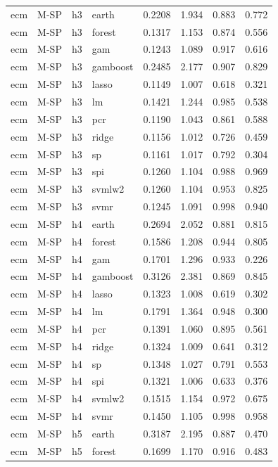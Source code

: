 \begin{ThreePartTable}
\begin{longtable}[t]{llclcccc}
\addlinespace
ecm & M-SP & h3 & earth & 0.2208 & 1.934 & 0.883 & 0.772\\
ecm & M-SP & h3 & forest & 0.1317 & 1.153 & 0.874 & 0.556\\
ecm & M-SP & h3 & gam & 0.1243 & 1.089 & 0.917 & 0.616\\
ecm & M-SP & h3 & gamboost & 0.2485 & 2.177 & 0.907 & 0.829\\
ecm & M-SP & h3 & lasso & 0.1149 & 1.007 & 0.618 & 0.321\\
ecm & M-SP & h3 & lm & 0.1421 & 1.244 & 0.985 & 0.538\\
ecm & M-SP & h3 & pcr & 0.1190 & 1.043 & 0.861 & 0.588\\
ecm & M-SP & h3 & ridge & 0.1156 & 1.012 & 0.726 & 0.459\\
ecm & M-SP & h3 & sp & 0.1161 & 1.017 & 0.792 & 0.304\\
ecm & M-SP & h3 & spi & 0.1260 & 1.104 & 0.988 & 0.969\\
ecm & M-SP & h3 & svmlw2 & 0.1260 & 1.104 & 0.953 & 0.825\\
ecm & M-SP & h3 & svmr & 0.1245 & 1.091 & 0.998 & 0.940\\
\addlinespace
ecm & M-SP & h4 & earth & 0.2694 & 2.052 & 0.881 & 0.815\\
ecm & M-SP & h4 & forest & 0.1586 & 1.208 & 0.944 & 0.805\\
ecm & M-SP & h4 & gam & 0.1701 & 1.296 & 0.933 & 0.226\\
ecm & M-SP & h4 & gamboost & 0.3126 & 2.381 & 0.869 & 0.845\\
ecm & M-SP & h4 & lasso & 0.1323 & 1.008 & 0.619 & 0.302\\
ecm & M-SP & h4 & lm & 0.1791 & 1.364 & 0.948 & 0.300\\
ecm & M-SP & h4 & pcr & 0.1391 & 1.060 & 0.895 & 0.561\\
ecm & M-SP & h4 & ridge & 0.1324 & 1.009 & 0.641 & 0.312\\
ecm & M-SP & h4 & sp & 0.1348 & 1.027 & 0.791 & 0.553\\
ecm & M-SP & h4 & spi & 0.1321 & 1.006 & 0.633 & 0.376\\
ecm & M-SP & h4 & svmlw2 & 0.1515 & 1.154 & 0.972 & 0.675\\
ecm & M-SP & h4 & svmr & 0.1450 & 1.105 & 0.998 & 0.958\\
\addlinespace
ecm & M-SP & h5 & earth & 0.3187 & 2.195 & 0.887 & 0.470\\
ecm & M-SP & h5 & forest & 0.1699 & 1.170 & 0.916 & 0.483\\

\end{longtable}
\end{ThreePartTable}
